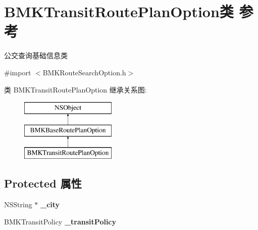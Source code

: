 \hypertarget{interface_b_m_k_transit_route_plan_option}{\section{B\+M\+K\+Transit\+Route\+Plan\+Option类 参考}
\label{interface_b_m_k_transit_route_plan_option}
}


公交查询基础信息类  




{\ttfamily \#import $<$B\+M\+K\+Route\+Search\+Option.\+h$>$}

类 B\+M\+K\+Transit\+Route\+Plan\+Option 继承关系图\+:\begin{figure}[H]
\begin{center}
\leavevmode
\includegraphics[height=3.000000cm]{interface_b_m_k_transit_route_plan_option}
\end{center}
\end{figure}
\subsection*{Protected 属性}
\begin{DoxyCompactItemize}
\item 
\hypertarget{interface_b_m_k_transit_route_plan_option_affceafe01e258cc5ede4f29c75ac9062}{N\+S\+String $\ast$ {\bfseries \+\_\+city}}\label{interface_b_m_k_transit_route_plan_option_affceafe01e258cc5ede4f29c75ac9062}

\item 
\hypertarget{interface_b_m_k_transit_route_plan_option_abd1d6515bb16bea503eca019739d5ffd}{B\+M\+K\+Transit\+Policy {\bfseries \+\_\+transit\+Policy}}\label{interface_b_m_k_transit_route_plan_option_abd1d6515bb16bea503eca019739d5ffd}

\end{DoxyCompactItemize}
